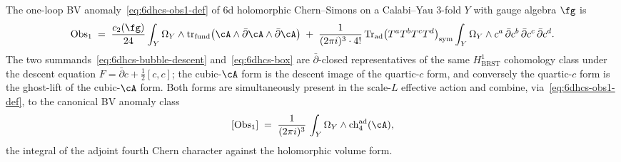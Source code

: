 \begin{theorem}
\label{thm:6dhcs-one-loop-anomaly}
The one-loop BV anomaly~\eqref{eq:6dhcs-obs1-def} of 6d holomorphic
Chern--Simons on a Calabi--Yau 3-fold $Y$ with gauge algebra $\fg$
is
\begin{equation}\label{eq:6dhcs-anomaly-cocycle}
 \mathrm{Obs}_1
 \;=\;
 \frac{c_2(\fg)}{24}
 \int_Y\Omega_Y\wedge
 \mathrm{tr}_{\mathrm{fund}}\bigl(\cA\wedge\bar\partial\cA
 \wedge\bar\partial\cA\bigr)
 \;+\;
 \frac{1}{(2\pi i)^3\cdot 4!}\,
 \mathrm{Tr}_{\mathrm{ad}}
 \bigl(T^aT^bT^cT^d\bigr)_{\mathrm{sym}}
 \int_Y\Omega_Y\wedge
 c^a\,\bar\partial c^b\,\bar\partial c^c\,\bar\partial c^d.
\end{equation}
The two summands~\eqref{eq:6dhcs-bubble-descent}
and~\eqref{eq:6dhcs-box} are $\bar\partial$-closed representatives
of the same $H^1_{\mathrm{BRST}}$ cohomology class under the descent
equation $F=\bar\partial c+\tfrac12[c,c]$; the cubic-$\cA$ form is
the descent image of the quartic-$c$ form, and conversely the
quartic-$c$ form is the ghost-lift of the cubic-$\cA$ form. Both
forms are simultaneously present in the scale-$L$ effective action
and combine, via~\eqref{eq:6dhcs-obs1-def}, to the canonical BV
anomaly class
\begin{equation}\label{eq:6dhcs-canonical-BV-anomaly}
 [\mathrm{Obs}_1]
 \;=\;
 \frac{1}{(2\pi i)^3}\,
 \int_Y\Omega_Y\wedge
 \mathrm{ch}_4^{\mathrm{ad}}(\cA),
\end{equation}
the integral of the adjoint fourth Chern character against the
holomorphic volume form.
\end{theorem}

